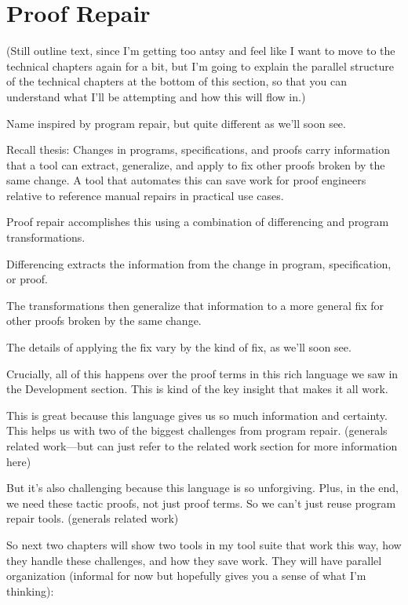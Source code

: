 \section{Proof Repair}
\label{sec:mot-rep}

(Still outline text, since I'm getting too antsy and feel like I want to move to the technical chapters again for a bit, but I'm going to explain the parallel structure of the technical
chapters at the bottom of this section, so that you can understand what I'll be attempting and how this will flow in.)

Name inspired by program repair, but quite different as we'll soon see.

Recall thesis: Changes in programs, specifications, and proofs carry information that a tool can extract, generalize, and apply to fix other proofs broken by the same change. A tool that automates this can save work for proof engineers relative to reference manual repairs in practical use cases.

Proof repair accomplishes this using a combination of differencing and program transformations.

Differencing extracts the information from the change in program, specification, or proof.

The transformations then generalize that information to a more general fix for other proofs broken by the same change.

The details of applying the fix vary by the kind of fix, as we'll soon see.

Crucially, all of this happens over the proof terms in this rich language we saw in the Development section. This is kind of the key insight that makes it all work.

This is great because this language gives us so much information and certainty. This helps us with two of the biggest challenges from 
program repair. (generals related work---but can just refer to the related work section for more information here)

But it's also challenging because this language is so unforgiving. Plus, in the end, we need these tactic proofs, not just proof terms. So we can't just reuse program repair tools. (generals related work)

So next two chapters will show two tools in my tool suite that work this way, how they handle these challenges, and how they save work.
They will have parallel organization (informal for now but hopefully gives you a sense of what I'm thinking):

